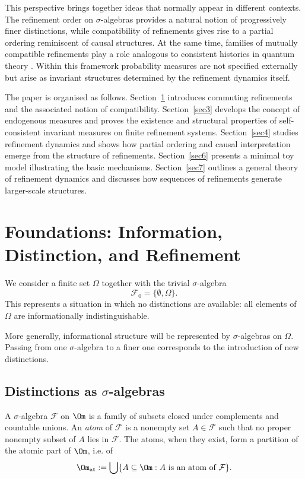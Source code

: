 \documentclass[
 amsmath,amssymb,
  onecolumn %
]{revtex4-2}
\newcommand{\Ff}{{\mathcal F}}  %
\begin{document}
This perspective brings together ideas that normally appear in
different contexts. The refinement order on $\sigma$-algebras provides
a natural notion of progressively finer distinctions, while
compatibility of refinements gives rise to a partial ordering
reminiscent of causal structures. At the same time, families of
mutually compatible refinements play a role analogous to consistent
histories in quantum theory \cite{Gr}. Within this framework
probability measures are not specified externally but arise as
invariant structures determined by the refinement dynamics itself.

The paper is organised as follows.  Section~\ref{sec2} introduces commuting
refinements and the associated notion of compatibility.  Section~\ref{sec3}
develops the concept of endogenous measures and proves the existence
and structural properties of self-consistent invariant measures on
finite refinement systems.  Section~\ref{sec4} studies refinement dynamics and
shows how partial ordering and causal interpretation emerge from the
structure of refinements.  Section~\ref{sec6} presents a minimal toy model
illustrating the basic mechanisms.  Section~\ref{sec7} outlines a general
theory of refinement dynamics and discusses how sequences of
refinements generate larger-scale structures.


\section{Foundations: Information, Distinction, and Refinement}\label{sec2}

We consider a finite set $\Omega$ together with the trivial $\sigma$-algebra
$$
\mathcal F_0 = \{\emptyset,\Omega\}.
$$
This represents a situation in which no distinctions are available: all elements of $\Omega$ are informationally indistinguishable.

More generally, informational structure will be represented by $\sigma$-algebras on $\Omega$. Passing from one $\sigma$-algebra to a finer one corresponds to the introduction of new distinctions.

\subsection{Distinctions as $\sigma$-algebras}

A $\sigma$-algebra $\Ff$ on $\Om$ is a family of subsets closed under complements and countable unions. An \emph{atom} of $\Ff$ is a nonempty set $A \in \Ff$ such that no proper nonempty subset of $A$ lies in $\Ff$. 
The atoms, when they exist, form a partition of the atomic part of $\Om$, i.e. of 
$$
\Om_{\rm at}:= \bigcup\{ A\subseteq\Om : A \text{ is an atom of } \Ff\}. 
$$
\end{document}

